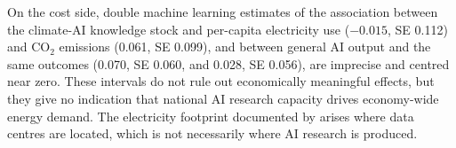 On the cost side, double machine learning estimates of the association between the climate-AI
knowledge stock and per-capita electricity use ($-0.015$, SE 0.112) and CO$_2$ emissions (0.061,
SE 0.099), and between general AI output and the same outcomes (0.070, SE 0.060, and 0.028, SE
0.056), are imprecise and centred near zero. These intervals do not rule out economically meaningful
effects, but they give no indication that national AI research capacity drives economy-wide energy
demand. The electricity footprint documented by \citet{iea2025} arises where data centres are
located, which is not necessarily where AI research is produced.
